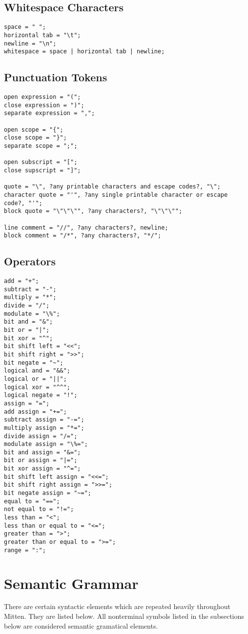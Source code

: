 \documentclass[10pt,a4paper]{article}
\begin{document}
\subsection{Whitespace Characters}
\begin{verbatim}
space = " ";
horizontal tab = "\t";
newline = "\n";
whitespace = space | horizontal tab | newline;
\end{verbatim}

\subsection{Punctuation Tokens}
\begin{verbatim}
open expression = "(";
close expression = ")";
separate expression = ",";

open scope = "{";
close scope = "}";
separate scope = ";";

open subscript = "[";
close supscript = "]";

quote = "\", ?any printable characters and escape codes?, "\";
character quote = "'", ?any single printable character or escape code?, "'";
block quote = "\"\"\"", ?any characters?, "\"\"\"";

line comment = "//", ?any characters?, newline;
block comment = "/*", ?any characters?, "*/";
\end{verbatim}

\subsection{Operators}
\begin{verbatim}
add = "+";
subtract = "-";
multiply = "*";
divide = "/";
modulate = "\%";
bit and = "&";
bit or = "|";
bit xor = "^";
bit shift left = "<<";
bit shift right = ">>";
bit negate = "~";
logical and = "&&";
logical or = "||";
logical xor = "^^";
logical negate = "!";
assign = "=";
add assign = "+=";
subtract assign = "-=";
multiply assign = "*=";
divide assign = "/=";
modulate assign = "\%=";
bit and assign = "&=";
bit or assign = "|=";
bit xor assign = "^=";
bit shift left assign = "<<=";
bit shift right assign = ">>=";
bit negate assign = "~=";
equal to = "==";
not equal to = "!=";
less than = "<";
less than or equal to = "<=";
greater than = ">";
greater than or equal to = ">=";
range = ":";
\end{verbatim}

\section{Semantic Grammar}
There are certain syntactic elements which are repeated heavily throughout Mitten. They are listed below. All nonterminal symbols listed in the subsections below are considered semantic gramatical elements.
\end{document}
